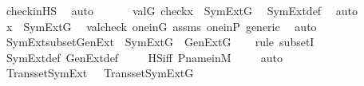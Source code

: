 \begin{isabellebody}
\ check{\isacharunderscore}{\kern0pt}in{\isacharunderscore}{\kern0pt}HS\ \isamarkupfalse%
\ auto\ \isanewline
\ \ \isamarkupfalse%
\ \isamarkupfalse%
\ {\isachardoublequoteopen}val{\isacharparenleft}{\kern0pt}G{\isacharcomma}{\kern0pt}\ check{\isacharparenleft}{\kern0pt}x{\isacharparenright}{\kern0pt}{\isacharparenright}{\kern0pt}\ {\isasymin}\ SymExt{\isacharparenleft}{\kern0pt}G{\isacharparenright}{\kern0pt}{\isachardoublequoteclose}\ \isamarkupfalse%
\ SymExt{\isacharunderscore}{\kern0pt}def\ \isamarkupfalse%
\ auto\ \isanewline
\ \ \isamarkupfalse%
\ \isamarkupfalse%
\ {\isachardoublequoteopen}x\ {\isasymin}\ SymExt{\isacharparenleft}{\kern0pt}G{\isacharparenright}{\kern0pt}{\isachardoublequoteclose}\ \isamarkupfalse%
\ valcheck\ one{\isacharunderscore}{\kern0pt}in{\isacharunderscore}{\kern0pt}G\ assms\ one{\isacharunderscore}{\kern0pt}in{\isacharunderscore}{\kern0pt}P\ generic\ \isamarkupfalse%
\ auto\ \isanewline
{}\isamarkupfalse%
%
\endisatagproof
{\isafoldproof}%
%
\isadelimproof
\isanewline
%
\endisadelimproof
\isanewline
{}\isamarkupfalse%
\ SymExt{\isacharunderscore}{\kern0pt}subset{\isacharunderscore}{\kern0pt}GenExt\ {\isacharcolon}{\kern0pt}\ {\isachardoublequoteopen}SymExt{\isacharparenleft}{\kern0pt}G{\isacharparenright}{\kern0pt}\ {\isasymsubseteq}\ GenExt{\isacharparenleft}{\kern0pt}G{\isacharparenright}{\kern0pt}{\isachardoublequoteclose}\ \isanewline
%
\isadelimproof
\ \ %
\endisadelimproof
%
\isatagproof
{}\isamarkupfalse%
{\isacharparenleft}{\kern0pt}rule\ subsetI{\isacharparenright}{\kern0pt}\isanewline
\ \ \isamarkupfalse%
\ SymExt{\isacharunderscore}{\kern0pt}def\ GenExt{\isacharunderscore}{\kern0pt}def\ \isanewline
\ \ \isamarkupfalse%
\ HS{\isacharunderscore}{\kern0pt}iff\ P{\isacharunderscore}{\kern0pt}name{\isacharunderscore}{\kern0pt}in{\isacharunderscore}{\kern0pt}M\ \isanewline
\ \ \isamarkupfalse%
\ auto%
\endisatagproof
{\isafoldproof}%
%
\isadelimproof
\isanewline
%
\endisadelimproof
\isanewline
{}\isamarkupfalse%
\ Transset{\isacharunderscore}{\kern0pt}SymExt\ {\isacharcolon}{\kern0pt}\ {\isachardoublequoteopen}\ Transset{\isacharparenleft}{\kern0pt}SymExt{\isacharparenleft}{\kern0pt}G{\isacharparenright}{\kern0pt}{\isacharparenright}{\kern0pt}{\isachardoublequoteclose}\ \isanewline
%
\isadelimproof
\ \ %
\endisadelimproof
%
\isatagproof
{}\isamarkupfalse%

\end{isabellebody}
